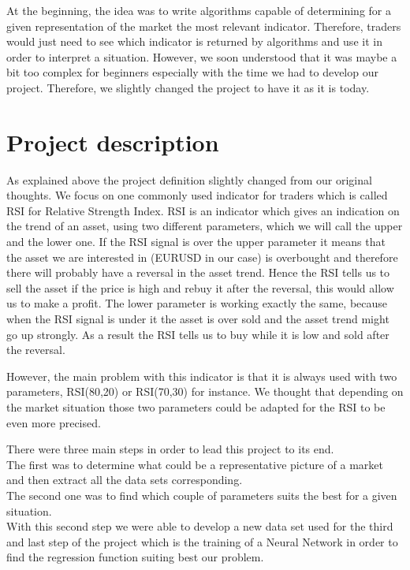 \documentclass[]{article}
\begin{document}
\vskip 0.5cm 
At the beginning, the idea was to write algorithms capable of determining for a given representation of the market the most relevant indicator. Therefore, traders would just need to see which indicator is returned by algorithms and use it in order to interpret a situation. However, we soon understood that it was maybe a bit too complex for beginners especially with the time we had to develop our project.
Therefore, we slightly changed the project to have it as it is today.

\section{Project description}

\vskip 0.5cm
As explained above the project definition slightly changed from our original thoughts. We focus on one commonly used indicator for traders which is called RSI for Relative Strength Index. RSI is an indicator which gives an indication on the trend of an asset, using two different parameters, which we will call the upper and the lower one. If the RSI signal is over the upper parameter it means that the asset we are interested in (EURUSD in our case) is overbought and therefore there will probably have a reversal in the asset trend. Hence the RSI tells us to sell the asset if the price is high and rebuy it after the reversal, this would allow us to make a profit. The lower parameter is working exactly the same, because when the RSI signal is under it the asset is over sold and the asset trend might go up strongly. As a result the RSI tells us to buy while it is low and sold after the reversal.

\vskip 0.5cm
However, the main problem with this indicator is that it is always used with two parameters, RSI(80,20) or RSI(70,30) for instance. We thought that depending on the market situation those two parameters could be adapted  for the RSI to be even more precised. 

\vskip 0.5cm
There were three main steps in order to lead this project to its end.\\
The first was to determine what could be a representative picture of a market and then extract all the data sets corresponding.\\
The second one was to find which couple of parameters suits the best for a given situation.\\
With this second step we were able to develop a new data set used for the third and last step of the project which is the training of a Neural Network in order to find the regression function suiting best our problem.  
\end{document}
